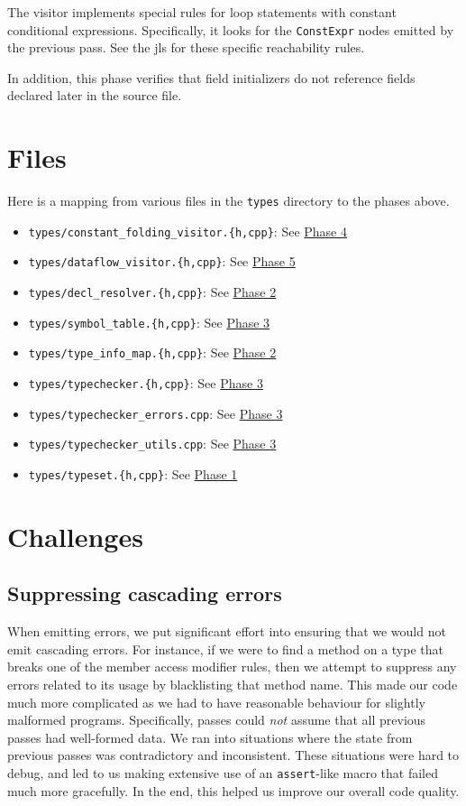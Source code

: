 \documentclass[12pt, titlepage]{article}
\newcommand{\z}[1]{\texttt{#1}}
\begin{document}
The visitor implements special rules for loop statements with constant
conditional expressions. Specifically, it looks for the \z{ConstExpr} nodes
emitted by the previous pass. See the \ac{jls} for these specific reachability
rules.

In addition, this phase verifies that field initializers do not reference
fields declared later in the source file.

\section{Files}

Here is a mapping from various files in the \z{types} directory to the 
phases above.

\begin{itemize}
  \item \z{types/constant\_folding\_visitor.\{h,cpp\}}: See \hyperref[subsubsec:const-prop]{Phase 4}
  \item \z{types/dataflow\_visitor.\{h,cpp\}}: See \hyperref[subsubsec:data-flow]{Phase 5}
  \item \z{types/decl\_resolver.\{h,cpp\}}: See \hyperref[subsubsec:fields]{Phase 2}
  \item \z{types/symbol\_table.\{h,cpp\}}: See \hyperref[subsubsec:type-checking]{Phase 3}
  \item \z{types/type\_info\_map.\{h,cpp\}}: See \hyperref[subsubsec:fields]{Phase 2}
  \item \z{types/typechecker.\{h,cpp\}}: See \hyperref[subsubsec:type-checking]{Phase 3}
  \item \z{types/typechecker\_errors.cpp}: See \hyperref[subsubsec:type-checking]{Phase 3}
  \item \z{types/typechecker\_utils.cpp}: See \hyperref[subsubsec:type-checking]{Phase 3}
  \item \z{types/typeset.\{h,cpp\}}: See \hyperref[subsubsec:col-types]{Phase 1}
\end{itemize}

\section{Challenges}

\subsection{Suppressing cascading errors}

When emitting errors, we put significant effort into ensuring that we would not
emit cascading errors. For instance, if we were to find a method on a type
that breaks one of the member access modifier rules, then we attempt to
suppress any errors related to its usage by blacklisting that method name. This
made our code much more complicated as we had to have reasonable behaviour for
slightly malformed programs. Specifically, passes could \emph{not} assume that
all previous passes had well-formed data. We ran into situations where the
state from previous passes was contradictory and inconsistent. These situations
were hard to debug, and led to us making extensive use of an \z{assert}-like
macro that failed much more gracefully. In the end, this helped us improve our
overall code quality.
\end{document}

